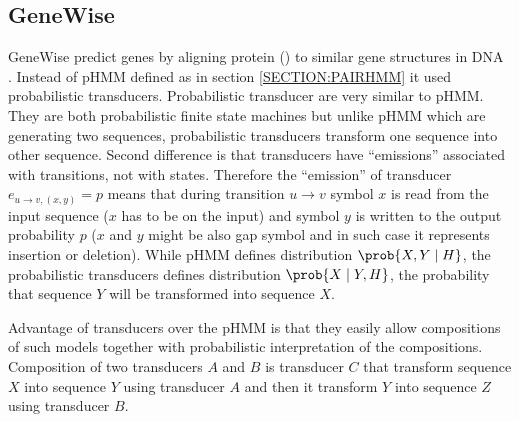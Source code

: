 %
%

\subsection{GeneWise}

GeneWise predict genes by aligning protein () to similar gene structures in DNA
\cite{GeneWise2004}. Instead of pHMM defined as in section \ref{SECTION:PAIRHMM}
it used probabilistic transducers. Probabilistic transducer are very similar to
pHMM. They are both probabilistic finite state machines but unlike pHMM which
are generating two sequences, probabilistic transducers transform one sequence
into other sequence.  Second difference is that transducers have ``emissions''
associated with transitions, not with states.  Therefore the ``emission'' of
transducer $e_{u\to v,(x,y)}=p$ means that during transition $u\to v$ symbol $x$
is read from the input sequence ($x$ has to be on the input) and symbol $y$ is
written to the output probability $p$ ($x$ and $y$ might be also gap symbol and
in such case it represents insertion or deletion).  While pHMM defines
distribution $\prob{X,Y\mid H}$, the probabilistic transducers defines
distribution $\prob{X\mid Y,H}$, the probability that sequence $Y$ will be
transformed into sequence $X$.

Advantage of transducers over the pHMM is that they easily allow compositions of
such models together with probabilistic interpretation of the compositions.
Composition of two transducers $A$ and $B$ is transducer $C$ that transform
sequence $X$ into sequence $Y$ using transducer $A$ and then it transform $Y$
into sequence $Z$ using transducer $B$. %

